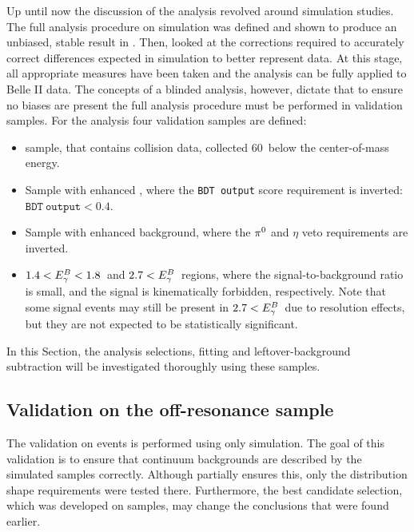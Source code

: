 Up until now the discussion of the analysis revolved around simulation studies.
The full analysis procedure on simulation was defined and shown to produce an unbiased, stable result in .
Then,  looked at the corrections required to accurately correct differences expected in simulation to better represent data.
At this stage, all appropriate measures have been taken and the analysis can be fully applied to Belle II data.
The concepts of a blinded analysis, however, dictate that to ensure no biases are present the full analysis procedure must be performed in validation samples.
For the \BtoXsgamma analysis four validation samples are defined:
\begin{itemize}
    \item \epem\ra\qqbar sample, that contains collision data, collected 60~\mev below the \FourS center-of-mass energy.
    \item Sample with enhanced \epem\ra\qqbar, where the \texttt{BDT~output} score requirement is inverted: $\mathtt{BDT~output}<0.4$.
    \item Sample with enhanced \BB background, where the $\pi^0$ and $\eta$ veto requirements are inverted.
    \item $1.4<{E^B_{\gamma}}<1.8$~\gev and $2.7<{E^B_{\gamma}}$~\gev regions, where the signal-to-background ratio is small, and the signal is kinematically forbidden, respectively.
    Note that some signal events may still be present in $2.7<{E^B_{\gamma}}$~\gev due to resolution effects, but they are not expected to be statistically significant.
\end{itemize}
In this Section, the analysis selections, \Mbc fitting and leftover-\BB background subtraction will be investigated thoroughly using these samples.

\subsection{Validation on the \texorpdfstring{\epem\ra\qqbar}{e+e- -> qqbar} off-resonance sample}\label{sec:continuum_spectrum_validation}

The validation on \epem\ra\qqbar events is performed using only \epem\ra\qqbar simulation.
The goal of this validation is to ensure that continuum backgrounds are described by the simulated samples correctly.
Although  partially ensures this, only the distribution shape requirements were tested there.
Furthermore, the best candidate selection, which was developed on \BB samples, may change the conclusions that were found earlier.

